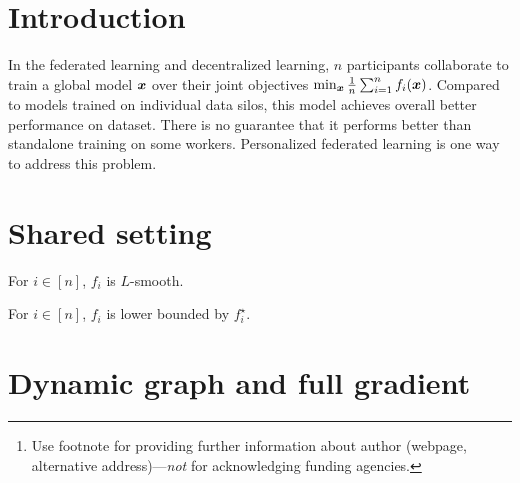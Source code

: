 \documentclass{article}
\title{}
\author{%
  David S.~Hippocampus\thanks{Use footnote for providing further information
    about author (webpage, alternative address)---\emph{not} for acknowledging
    funding agencies.} \\
  Department of Computer Science\\
  Cranberry-Lemon University\\
  Pittsburgh, PA 15213 \\
  \texttt{hippo@cs.cranberry-lemon.edu} \\
}
\begin{document}
\maketitle

%    
\section{Introduction}

In the federated learning and decentralized learning, $n$ participants collaborate to train a global model $\bm{x}$ over their joint objectives $\min_{\bm{x}} \frac{1}{n}\sum_{i=1}^n f_i(\bm{x})$.
Compared to models trained on individual data silos, this model achieves overall better performance on dataset. 
There is no guarantee that it performs better than standalone training on some workers. 
Personalized federated learning is one way to address this problem. 
% 

\section{Shared setting}
\begin{assumption}[$L$-smoothness]\label{a:smooth}
  For $i\in[n]$, $f_i$ is $L$-smooth.
\end{assumption}
\begin{assumption}\label{a:lower-bound}
  For $i\in[n]$, $f_i$ is lower bounded by $f_i^\star$.
\end{assumption}

\section{Dynamic graph and full gradient}
\end{document}
